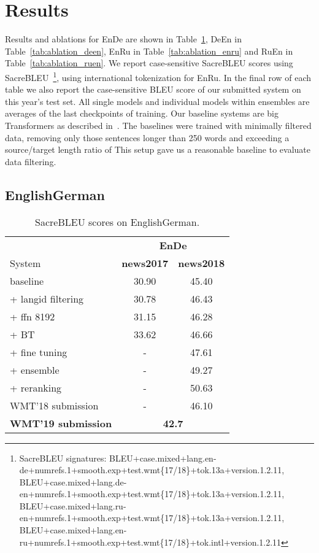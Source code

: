 \documentclass[11pt,a4paper]{article}
\newcommand{\entode}{EnDe}
\newcommand{\detoen}{DeEn}
\newcommand{\entoru}{EnRu}
\newcommand{\rutoen}{RuEn}
\begin{document}
\section{Results}
Results and ablations for \entode{} are shown in Table~\ref{tab:ablation_ende}, \detoen{} in Table~\ref{tab:ablation_deen}, \entoru{} in Table~\ref{tab:ablation_enru} and \rutoen{} in Table~\ref{tab:ablation_ruen}.
We report case-sensitive SacreBLEU scores using SacreBLEU~\cite{matt2018clarity}\footnote{SacreBLEU signatures:\newline{} BLEU+case.mixed+lang.en-de+numrefs.1+smooth.exp+\newline{}test.wmt\{17/18\}+tok.13a+version.1.2.11, BLEU+case.mixed+lang.de-en+numrefs.1+smooth.exp+\newline{}test.wmt\{17/18\}+tok.13a+version.1.2.11, BLEU+case.mixed+lang.ru-en+numrefs.1+smooth.exp+\newline{}test.wmt\{17/18\}+tok.13a+version.1.2.11, BLEU+case.mixed+lang.en-ru+numrefs.1+smooth.exp+\newline{}test.wmt\{17/18\}+tok.intl+version.1.2.11}, using international tokenization for \entoru{}.
In the final row of each table we also report the case-sensitive BLEU score of our submitted system on this year's test set.
All single models and individual models within ensembles are averages of the last  checkpoints of training.
Our baseline systems are big Transformers as described in~\cite{vaswani2017attention}.
The baselines were trained with minimally filtered data, removing only those sentences longer than 250 words and exceeding a source/target length ratio of 
This setup gave us a reasonable baseline to evaluate data filtering.

\subsection{EnglishGerman}
\begin{table}[t]
\centering
\begin{tabular}{lcc}
\toprule
& \multicolumn{2}{c}{\textbf{\entode{}}} \\
System & \bf news2017 & \bf news2018 \\ \midrule
baseline & 30.90 & 45.40 \\ 
+ langid filtering & 30.78 & 46.43 \\
+ ffn 8192 & 31.15 & 46.28 \\
+ BT & 33.62 & 46.66 \\
+ fine tuning & - & 47.61\\
+ ensemble & - & 49.27 \\
+ reranking & - & 50.63 \\
WMT'18 submission & - & 46.10 \\
\midrule
\bf WMT'19 submission & \multicolumn{2}{c}{\bf 42.7} \\ 
\bottomrule
\end{tabular}
\caption{SacreBLEU scores on EnglishGerman. 
}
\label{tab:ablation_ende}
\end{table}
\end{document}
